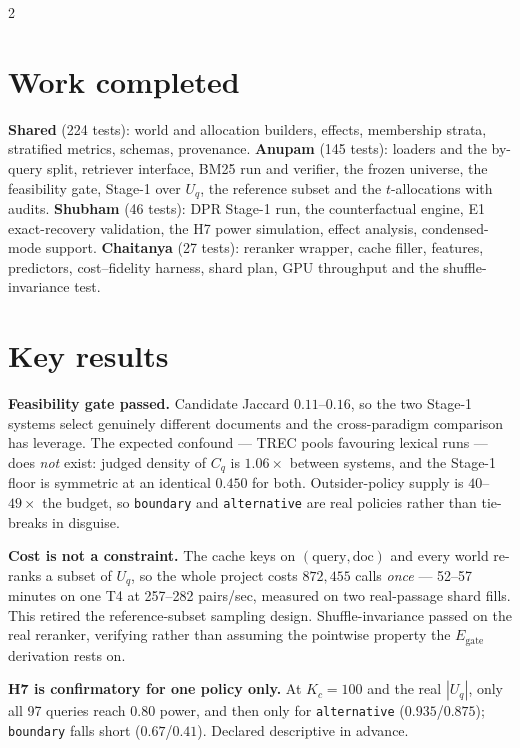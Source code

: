\documentclass[10pt,a4paper]{article}
\newcommand{\Uq}{U_q}
\newcommand{\Kc}{K_c}
\begin{document}
\vspace{2pt}
\begin{multicols}{2}\small
\section{Work completed}

\textbf{Shared} (224 tests): world and allocation builders, effects,
membership strata, stratified metrics, schemas, provenance. \textbf{Anupam}
(145 tests): loaders and the by-query split, retriever interface, BM25 run and
verifier, the frozen universe, the feasibility gate, Stage-1 over $\Uq$, the
reference subset and the $t$-allocations with audits. \textbf{Shubham} (46 tests): DPR
Stage-1 run, the counterfactual engine, E1 exact-recovery validation, the H7
power simulation, effect analysis, condensed-mode support. \textbf{Chaitanya}
(27 tests): reranker wrapper, cache filler, features, predictors,
cost--fidelity harness, shard plan, GPU throughput and the shuffle-invariance
test.

\section{Key results}

\textbf{Feasibility gate passed.} Candidate Jaccard $0.11$--$0.16$, so the two
Stage-1 systems select genuinely different documents and the cross-paradigm
comparison has leverage. The expected confound --- TREC pools favouring lexical
runs --- does \emph{not} exist: judged density of $C_q$ is $1.06\times$ between
systems, and the Stage-1 floor is symmetric at an identical $0.450$ for both.
Outsider-policy supply is $40$--$49\times$ the budget, so \texttt{boundary} and
\texttt{alternative} are real policies rather than tie-breaks in disguise.

\textbf{Cost is not a constraint.} The cache keys on
$(\text{query},\text{doc})$ and every world re-ranks a subset of $\Uq$, so the
whole project costs $872{,}455$ calls \emph{once} --- 52--57 minutes on one
T4 at \mbox{257--282} pairs/sec, measured on two real-passage shard fills. This
retired the reference-subset sampling design.
Shuffle-invariance passed on the real reranker, verifying rather than assuming
the pointwise property the $E_{\text{gate}}$ derivation rests on.

\textbf{H7 is confirmatory for one policy only.} At $\Kc{=}100$ and the real
$|\Uq|$, only all 97 queries reach $0.80$ power, and then only for
\texttt{alternative} ($0.935$/$0.875$); \texttt{boundary} falls short
($0.67$/$0.41$). Declared descriptive in advance.


\end{multicols}
\end{document}
